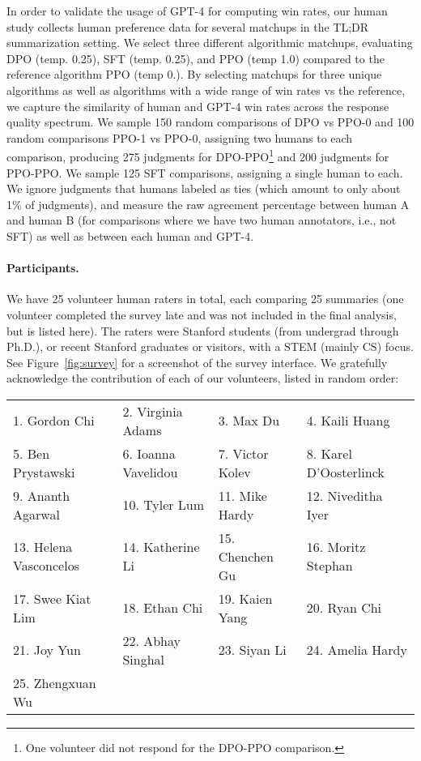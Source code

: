 \documentclass{article}
\begin{document}
In order to validate the usage of GPT-4 for computing win rates, our human study collects human preference data for several matchups in the TL;DR summarization setting. We select three different algorithmic matchups, evaluating DPO (temp. 0.25), SFT (temp. 0.25), and PPO (temp 1.0) compared to the reference algorithm PPO (temp 0.). By selecting matchups for three unique algorithms as well as algorithms with a wide range of win rates vs the reference, we capture the similarity of human and GPT-4 win rates across the response quality spectrum. We sample 150 random comparisons of DPO vs PPO-0 and 100 random comparisons PPO-1 vs PPO-0, assigning two humans to each comparison, producing 275 judgments for DPO-PPO\footnote{One volunteer did not respond for the DPO-PPO comparison.} and 200 judgments for PPO-PPO. We sample 125 SFT comparisons, assigning a single human to each. We ignore judgments that humans labeled as ties (which amount to only about 1\% of judgments), and measure the raw agreement percentage between human A and human B (for comparisons where we have two human annotators, i.e., not SFT) as well as between each human and GPT-4.

\paragraph{Participants.} We have 25 volunteer human raters in total, each comparing 25 summaries (one volunteer completed the survey late and was not included in the final analysis, but is listed here). The raters were Stanford students (from undergrad through Ph.D.), or recent Stanford graduates or visitors, with a STEM (mainly CS) focus. See Figure~\ref{fig:survey} for a screenshot of the survey interface. We gratefully acknowledge the contribution of each of our volunteers, listed in random order:

\begin{table}[h]
\begin{tabular}{llll}
1. Gordon Chi         & 2. Virginia Adams      & 3. Max Du             & 4. Kaili Huang        \\
5. Ben Prystawski     & 6. Ioanna Vavelidou    & 7. Victor Kolev       & 8. Karel D'Oosterlinck\\
9. Ananth Agarwal     & 10. Tyler Lum          & 11. Mike Hardy        & 12. Niveditha Iyer         \\
13. Helena Vasconcelos& 14. Katherine Li       & 15. Chenchen Gu       & 16. Moritz Stephan    \\
17. Swee Kiat Lim     & 18. Ethan Chi          & 19. Kaien Yang        & 20. Ryan Chi          \\
21. Joy Yun           & 22. Abhay Singhal      & 23. Siyan Li          & 24. Amelia Hardy      \\
25. Zhengxuan Wu      &                        &                       &                       \\
\end{tabular}
\end{table}
\end{document}
